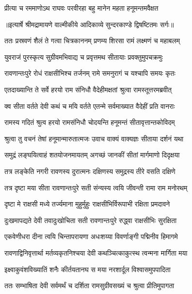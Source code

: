 \twolineshloka
{प्रीत्या च रममाणोऽथ राघवः परवीरहा}
{बहु मानेन महता हनूमन्तमवैक्षत} %


{॥इत्यार्षे श्रीमद्रामायणे वाल्मीकीये आदिकाव्ये सुन्दरकाण्डे द्विषष्टितमः सर्गः॥}


\twolineshloka
{ततः प्रस्रवणं शैलं ते गत्वा चित्रकाननम्}
{प्रणम्य शिरसा रामं लक्ष्मणं च महाबलम्} %

\twolineshloka
{युवराजं पुरस्कृत्य सुग्रीवमभिवाद्य च}
{प्रवृत्तमथ सीतायाः प्रवक्तुमुपचक्रमुः} %

\twolineshloka
{रावणान्तःपुरे रोधं राक्षसीभिश्च तर्जनम्}
{रामे समनुरागं च यश्चापि समयः कृतः} %

\twolineshloka
{एतदाख्यान्ति ते सर्वे हरयो राम संनिधौ}
{वैदेहीमक्षतां श्रुत्वा रामस्तूत्तरमब्रवीत्} %

\twolineshloka
{क्व सीता वर्तते देवी कथं च मयि वर्तते}
{एतन्मे सर्वमाख्यात वैदेहीं प्रति वानराः} %

\twolineshloka
{रामस्य गदितं श्रुत्व हरयो रामसंनिधौ}
{चोदयन्ति हनूमन्तं सीतावृत्तान्तकोविदम्} %

\twolineshloka
{श्रुत्वा तु वचनं तेषां हनूमान्मारुतात्मजः}
{उवाच वाक्यं वाक्यज्ञः सीताया दर्शनं यथा} %

\twolineshloka
{समुद्रं लङ्घयित्वाहं शतयोजनमायतम्}
{अगच्छं जानकीं सीतां मार्गमाणो दिदृक्षया} %

\twolineshloka
{तत्र लङ्केति नगरी रावणस्य दुरात्मनः}
{दक्षिणस्य समुद्रस्य तीरे वसति दक्षिणे} %

\twolineshloka
{तत्र दृष्टा मया सीता रावणान्तःपुरे सती}
{संन्यस्य त्वयि जीवन्ती रामा राम मनोरथम्} %

\twolineshloka
{दृष्टा मे राक्षसी मध्ये तर्ज्यमाना मुहुर्मुहुः}
{राक्षसीभिर्विरूपाभी रक्षिता प्रमदावने} %

\twolineshloka
{दुःखमापद्यते देवी तवादुःखोचिता सती}
{रावणान्तःपुरे रुद्ध्वा राक्षसीभिः सुरक्षिता} %

\twolineshloka
{एकवेणीधरा दीना त्वयि चिन्तापरायणा}
{अधःशय्या विवर्णाङ्गी पद्मिनीव हिमागमे} %

\twolineshloka
{रावणाद्विनिवृत्तार्था मर्तव्यकृतनिश्चया}
{देवी कथञ्चित्काकुत्स्थ त्वन्मना मार्गिता मया} %

\twolineshloka
{इक्ष्वाकुवंशविख्यातिं शनैः कीर्तयतानघ}
{स मया नरशार्दूल विश्वासमुपपादिता} %

\twolineshloka
{ततः सम्भाषिता देवी सर्वमर्थं च दर्शिता}
{रामसुग्रीवसख्यं च श्रुत्वा प्रीतिमुपागता} %

